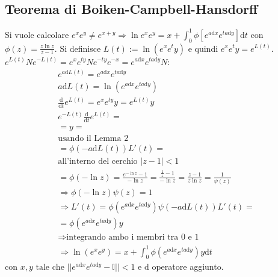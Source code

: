 \subsection{Teorema di Boiken-Campbell-Hansdorff} %
Si vuole calcolare $e^xe^y\neq e^{x+y} \Longrightarrow \ln{e^xe^y}=x+\int_{0}^{1}{\phi\left[e^{a\textrm{d}x}e^{ta\textrm{d}y}\right] \textrm{d}t}$ con $\phi\left(z\right)=\frac{z\ln{z}}{z-1}$. Si definisce $L\left(t\right):=\ln{\left(e^xe^ty\right)}$ e quindi $e^xe^ty=e^{L\left(t\right)}$. $e^{L\left(t\right)}Ne^{-L\left(t\right)}=e^xe^{ty}Ne^{-ty}e^{-x}=e^{a\textrm{d}x}e^{ta\textrm{d}y}N$:
\begin{equation}\begin{split}
e^{a\textrm{d}L\left(t\right)}=e^{a\textrm{d}x}e^{ta\textrm{d}y} \\
a\textrm{d}L\left(t\right)=\ln{\left(e^{a\textrm{d}x}e^{ta\textrm{d}y}\right)} \\
\frac{\textrm{d}}{\textrm{d}t}e^{L\left(t\right)}=e^xe^{ty}y=e^{L\left(t\right)}y \\
e^{-L\left(t\right)}\frac{\textrm{d}}{\textrm{d}t}e^{L\left(t\right)}= \\
=y= \\
\textrm{usando il Lemma 2} \\
=\phi\left(-a\textrm{d}L\left(t\right)\right)L'\left(t\right)= \\
\textrm{all'interno del cerchio } |z-1|<1 \\
=\phi\left(-\ln{z}\right)=\frac{e^{-\ln{z}}-1}{-\ln{z}}=\frac{\frac{1}{z}-1}{-\ln{z}}=\frac{z-1}{z\ln{z}}=\frac{1}{\psi\left(z\right)} \\
\Longrightarrow \phi\left(-\ln{z}\right)\psi \left(z\right)=1 \\
\Longrightarrow L'\left(t\right)=\phi\left(e^{a\textrm{d}x}e^{ta\textrm{d}y}\right)\psi \left(-a\textrm{d}L\left(t\right)\right)L'\left(t\right)= \\
=\phi\left(e^{a\textrm{d}x}e^{ta\textrm{d}y}\right)y \\
\Longrightarrow \textrm{integrando ambo i membri tra 0 e 1} \\
\Longrightarrow \ln{\left(e^xe^y\right)}=x+\int_{0}^{1}{\phi\left(e^{a\textrm{d}x}e^{ta\textrm{d}y}\right)y  \textrm{d}t}
\end{split}\end{equation}
con $x,y \textrm{ tale che } ||e^{a\textrm{d}x}e^{ta\textrm{d}y}-\mathbb{I}||<1$ e $\textrm{d}$ operatore aggiunto.


